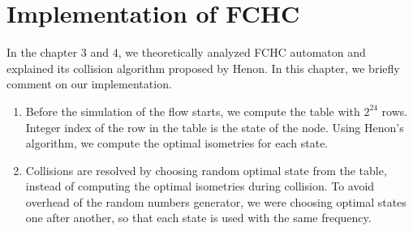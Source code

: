 \chapter{Implementation of FCHC}

In the chapter $3$ and $4$, we theoretically analyzed FCHC automaton and explained its collision algorithm proposed by Henon. In this chapter, we briefly comment on our implementation.

%



\begin{enumerate}
\item Before the simulation of the flow starts, we compute the table with $2^{24}$ rows. Integer index of the row in the table is the state of the node. Using Henon's algorithm, we compute the optimal isometries for each state.
\item Collisions are resolved by choosing random optimal state from the table, instead of computing the optimal isometries during collision. To avoid overhead of the random numbers generator, we were choosing optimal states one after another, so that each state is used with the same frequency.
%
\end{enumerate}

